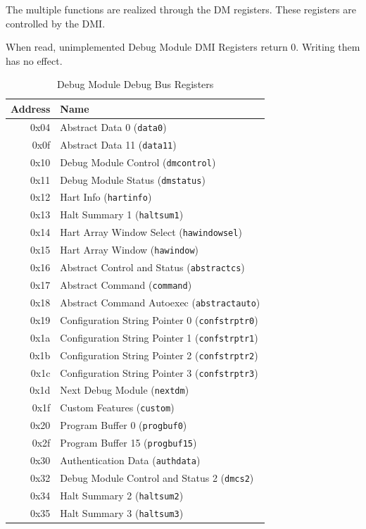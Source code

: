\documentclass{article}
\begin{document}
	The multiple functions are realized through the DM registers. These registers are controlled by the DMI.
	
	When read, unimplemented Debug Module DMI Registers return 0. Writing them has no effect.
	
	\begin{table}[H]
   \begin{center}
      \caption{Debug Module Debug Bus Registers}
      \label{dm}
      \begin{tabular}{|r|l|}
      \hline
      Address & Name \\
      \hline
0x04 & Abstract Data 0 ({\tt data0}) \\
0x0f & Abstract Data 11 ({\tt data11}) \\
0x10 & Debug Module Control ({\tt dmcontrol}) \\
0x11 & Debug Module Status ({\tt dmstatus}) \\
0x12 & Hart Info ({\tt hartinfo}) \\
0x13 & Halt Summary 1 ({\tt haltsum1}) \\
0x14 & Hart Array Window Select ({\tt hawindowsel}) \\
0x15 & Hart Array Window  ({\tt hawindow}) \\
0x16 & Abstract Control and Status ({\tt abstractcs}) \\
0x17 & Abstract Command ({\tt command}) \\
0x18 & Abstract Command Autoexec ({\tt abstractauto}) \\
0x19 & Configuration String Pointer 0 ({\tt confstrptr0}) \\
0x1a & Configuration String Pointer 1 ({\tt confstrptr1}) \\
0x1b & Configuration String Pointer 2 ({\tt confstrptr2}) \\
0x1c & Configuration String Pointer 3 ({\tt confstrptr3}) \\
0x1d & Next Debug Module ({\tt nextdm}) \\
0x1f & Custom Features ({\tt custom}) \\
0x20 & Program Buffer 0 ({\tt progbuf0}) \\
0x2f & Program Buffer 15 ({\tt progbuf15}) \\
0x30 & Authentication Data ({\tt authdata}) \\
0x32 & Debug Module Control and Status 2 ({\tt dmcs2}) \\
0x34 & Halt Summary 2 ({\tt haltsum2}) \\
0x35 & Halt Summary 3 ({\tt haltsum3}) \\

\end{tabular}
\end{center}
\end{table}
\end{document}
